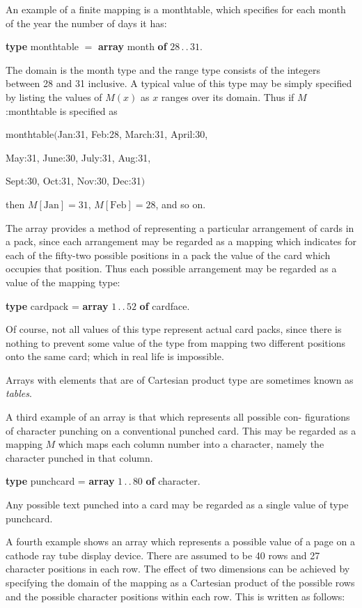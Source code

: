 \documentclass[twoside,11pt]{book}
\begin{document}
An example of a finite mapping is a monthtable, which specifies for each month of the year the number of days it has:

\quad \textbf{type} monthtable $=$ \textbf{array} month \textbf{of} $28\,.\,.\,31$.

\noindent
The domain is the month type and the range type consists of the integers between 28 and 31 inclusive. A typical value of this type may be simply specified by listing the values of $M(x)$ as $x$ ranges over its domain. Thus if $M$:monthtable is specified as

\quad monthtable$($Jan:31, Feb:28, March:31, April:30,

\quad May:31, June:30, July:31, Aug:31,

\quad Sept:30, Oct:31, Nov:30, Dec:31$)$

\noindent
then $M[\text{Jan}] = 31,\, M[\text{Feb}] = 28$, and so on.

The array provides a method of representing a particular arrangement of cards in a pack, since each arrangement may be regarded as a mapping which indicates for each of the fifty-two possible positions in a pack the value of the card which occupies that position. Thus each possible arrangement may be regarded as a value of the mapping type:

\quad \textbf{type} cardpack = \textbf{array} $1\,.\,.\,52$ \textbf{of} cardface.

\noindent
Of course, not all values of this type represent actual card packs, since there is nothing to prevent some value of the type from mapping two different positions onto the same card; which in real life is impossible.

Arrays with elements that are of Cartesian product type are sometimes known as \textit{tables}.

A third example of an array is that which represents all possible con- figurations of character punching on a conventional punched card. This may be regarded as a mapping $M$ which maps each column number into a character, namely the character punched in that column.

\quad \textbf{type} punchcard = \textbf{array} $1\,.\,.\,80$ \textbf{of} character.

\noindent
Any possible text punched into a card may be regarded as a single value of type punchcard.

A fourth example shows an array which represents a possible value of a page on a cathode ray tube display device. There are assumed to be 40 rows and 27 character positions in each row. The effect of two dimensions can be achieved by specifying the domain of the mapping as a Cartesian product of the possible rows and the possible character positions within each row. This is written as follows:
\end{document}
